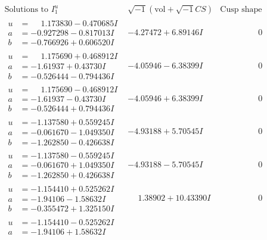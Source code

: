 \documentclass[1p]{elsarticle_modified}
\theoremstyle{definition}
\newcommand{\I}{\sqrt{-1}}
\begin{document}
$$\begin{array}{c|c|c}
\text{Solutions to }I^u_{1}& \I (\text{vol} + \sqrt{-1}CS) & \text{Cusp shape}\\
 \hline 
\begin{aligned}
u &= \phantom{-}1.173830 - 0.470685 I \\
a &= -0.927298 - 0.817013 I \\
b &= -0.766926 + 0.606520 I\end{aligned}
 & -4.27472 + 6.89146 I & \phantom{-0.000000 } 0 \\ \hline\begin{aligned}
u &= \phantom{-}1.175690 + 0.468912 I \\
a &= -1.61937 + 0.43730 I \\
b &= -0.526444 - 0.794436 I\end{aligned}
 & -4.05946 - 6.38399 I & \phantom{-0.000000 } 0 \\ \hline\begin{aligned}
u &= \phantom{-}1.175690 - 0.468912 I \\
a &= -1.61937 - 0.43730 I \\
b &= -0.526444 + 0.794436 I\end{aligned}
 & -4.05946 + 6.38399 I & \phantom{-0.000000 } 0 \\ \hline\begin{aligned}
u &= -1.137580 + 0.559245 I \\
a &= -0.061670 - 1.049350 I \\
b &= -1.262850 - 0.426638 I\end{aligned}
 & -4.93188 + 5.70545 I & \phantom{-0.000000 } 0 \\ \hline\begin{aligned}
u &= -1.137580 - 0.559245 I \\
a &= -0.061670 + 1.049350 I \\
b &= -1.262850 + 0.426638 I\end{aligned}
 & -4.93188 - 5.70545 I & \phantom{-0.000000 } 0 \\ \hline\begin{aligned}
u &= -1.154410 + 0.525262 I \\
a &= -1.94106 - 1.58632 I \\
b &= -0.355472 + 1.325150 I\end{aligned}
 & \phantom{-}1.38902 + 10.43390 I & \phantom{-0.000000 } 0 \\ \hline\begin{aligned}
u &= -1.154410 - 0.525262 I \\
a &= -1.94106 + 1.58632 I \\

\end{aligned}
\end{array}$$
\end{document}
